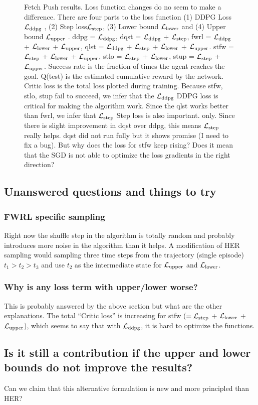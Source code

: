 \begin{figure}
  \caption{
    Fetch Push results. Loss function changes do no seem to make a difference.
    There are four parts to the loss function (1) DDPG Loss $\mathcal{L}_{\text{ddpg}}$ ,
    (2) Step loss$\mathcal{L}_{\text{step}}$,  
    (3) Lower bound $\mathcal{L}_{\text{lower}}$ and
    (4) Upper bound $\mathcal{L}_{\text{upper}}$ .
    ddpg = $\mathcal{L}_{\text{ddpg}}$,
    dqst = $\mathcal{L}_{\text{ddpg}}$ + $\mathcal{L}_{\text{step}}$,
    fwrl = $\mathcal{L}_{\text{ddpg}}$ + $\mathcal{L}_{\text{lower}}$ +
    $\mathcal{L}_{\text{upper}}$,
    qlst = $\mathcal{L}_{\text{ddpg}}$ + $\mathcal{L}_{\text{step}}$ + $\mathcal{L}_{\text{lower}}$ + $\mathcal{L}_{\text{upper}}$.
    stfw = $\mathcal{L}_{\text{step}}$ + $\mathcal{L}_{\text{lower}}$ + $\mathcal{L}_{\text{upper}}$,
    stlo = $\mathcal{L}_{\text{step}}$ + $\mathcal{L}_{\text{lower}}$,
    stup = $\mathcal{L}_{\text{step}}$ + $\mathcal{L}_{\text{upper}}$.
    Success rate is the fraction of times the agent reaches the goal. Q(test) is
    the estimated cumulative reward by the network. Critic loss is the total
    loss plotted during training.
    Because stfw, stlo, stup fail to succeed, we infer that the $\mathcal{L}_{\text{ddpg}}$ DDPG loss is
    critical for making the algorithm work. Since the qlst works better than
    fwrl, we infer that $\mathcal{L}_{\text{step}}$ Step loss is also important.
    only.
    Since there is slight improvement in dqst over ddpg, this means
    $\mathcal{L}_{\text{step}}$ really helps. dqst did not run fully but it shows
    promise (I need to fix a bug).
    But why does the loss for stfw keep rising? Does it mean that the SGD is not
    able to optimize the loss gradients in the right direction?
  }%
  \label{fig:fwrl-stepfwrl-noop-FetchPush}%
\end{figure}%
% 


\subsection{Unanswered questions and things to try}

\subsubsection{FWRL specific sampling}
Right now the shuffle step in the algorithm is totally random and probably
introduces more noise in the algorithm than it helps. A modification of HER
sampling would sampling three time steps from the trajectory (single episode)
$t_1 > t_2 > t_3$ and use $t_2$ as the intermediate state for
$\mathcal{L}_{\text{upper}}$ and $\mathcal{L}_{\text{lower}}$.


\subsubsection{Why is any loss term with upper/lower worse?}
This is probably answered by  the above section but what are the other
explanations. The total ``Critic loss'' is increasing for stfw
($=\mathcal{L}_{\text{step}}$ + $\mathcal{L}_{\text{lower}}$ + $\mathcal{L}_{\text{upper}}$),
which seems to say that with $\mathcal{L}_{\text{ddpg}}$, it is hard to optimize the functions.


\subsection{Is it still a contribution if the upper and lower bounds do not
  improve the results?}
Can we claim that this alternative formulation is new and more principled than HER?